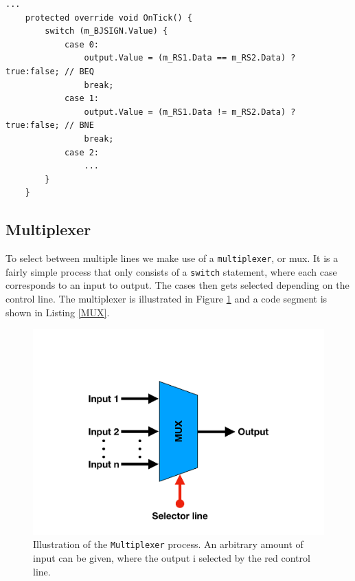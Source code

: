         \begin{minipage}{\linewidth}
            \begin{lstlisting}[language={[Sharp]C}, caption={A slice of the \texttt{Go To} process SME code. The unit consists of a \texttt{switch} statement, where each case does the comparison relevandt to the branching instruction. The conditional operator \texttt{?} is used for the comparison (the syntax goes as follows \texttt{condition ? If true return this : If false return this}).},captionpos=b, label = GOTO]
...
    protected override void OnTick() {
        switch (m_BJSIGN.Value) {
            case 0:
                output.Value = (m_RS1.Data == m_RS2.Data) ? true:false; // BEQ
                break;
            case 1:
                output.Value = (m_RS1.Data != m_RS2.Data) ? true:false; // BNE
                break;
            case 2:
                ...
        }
    }
            \end{lstlisting}
        \end{minipage}
    
    \subsection{Multiplexer}
        To select between multiple lines we make use of a \texttt{multiplexer}, or mux. It is a fairly simple process that only consists of a \texttt{switch} statement, where each case corresponds to an input to output. The cases then gets selected depending on the control line. The multiplexer is illustrated in Figure \ref{fig:MUX} and a code segment is shown in Listing \ref{MUX}.
        
        \begin{figure}[h!]
            \centering
            \includegraphics[scale=0.35]{pictures/MUX.pdf}
            \caption{Illustration of the \texttt{Multiplexer} process. An arbitrary amount of input can be given, where the output i selected by the red control line. }
            \label{fig:MUX}
        \end{figure}
    
